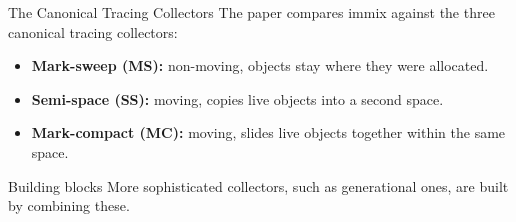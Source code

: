 \documentclass[aspectratio=169]{beamer}
\begin{document}
\begin{frame}{The Canonical Tracing Collectors}
	The paper compares immix against the three canonical tracing collectors:

	\begin{itemize}
		\item \textbf{Mark-sweep (MS):} non-moving, objects stay where they were allocated.
		\item \textbf{Semi-space (SS):} moving, copies live objects into a second space.
		\item \textbf{Mark-compact (MC):} moving, slides live objects together within the same space.
	\end{itemize}

	\begin{exampleblock}{Building blocks}
		\vspace{0.1em}
		More sophisticated collectors, such as generational ones, are built by combining these.
	\end{exampleblock}
\end{frame}
\end{document}
